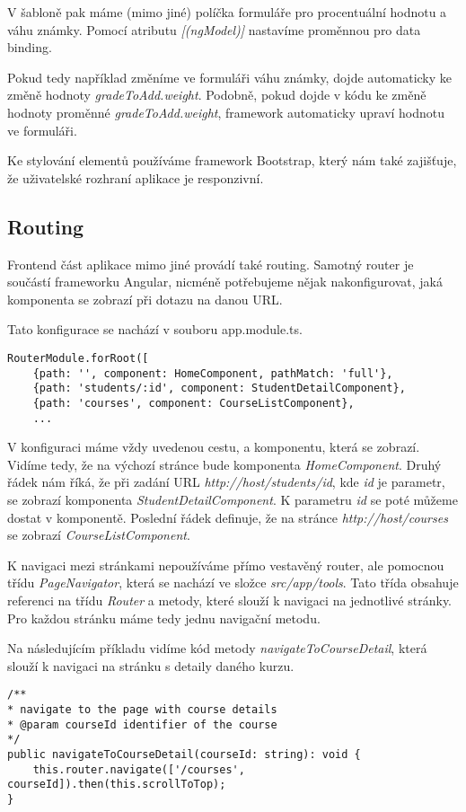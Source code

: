 V šabloně pak máme (mimo jiné) políčka formuláře pro procentuální hodnotu a váhu známky.
Pomocí atributu \textit{[(ngModel)]} nastavíme proměnnou pro data binding. 

Pokud tedy například změníme ve formuláři váhu známky, dojde automaticky ke změně hodnoty \textit{gradeToAdd.weight}. Podobně, pokud dojde v kódu ke změně hodnoty proměnné \textit{gradeToAdd.weight}, framework automaticky upraví hodnotu ve formuláři.

Ke stylování elementů používáme framework Bootstrap, který nám také zajišťuje, že uživatelské rozhraní aplikace je responzivní.

\subsection{Routing}

Frontend část aplikace mimo jiné provádí také routing. Samotný router je součástí frameworku Angular, nicméně potřebujeme nějak nakonfigurovat, jaká komponenta se zobrazí při dotazu na danou URL.

Tato konfigurace se nachází v souboru app.module.ts.
\lstset{style=typescript}
\begin{lstlisting}
RouterModule.forRoot([
	{path: '', component: HomeComponent, pathMatch: 'full'},
	{path: 'students/:id', component: StudentDetailComponent},
	{path: 'courses', component: CourseListComponent},
	...
\end{lstlisting}

V konfiguraci máme vždy uvedenou cestu, a komponentu, která se zobrazí.
Vidíme tedy, že na výchozí stránce bude komponenta \textit{HomeComponent}. 
Druhý řádek nám říká, že při zadání URL \textit{http://host/students/id}, kde \textit{id} je parametr, se zobrazí komponenta \textit{StudentDetailComponent}. K parametru \textit{id} se poté můžeme dostat v komponentě.
Poslední řádek definuje, že na stránce \textit{http://host/courses} se zobrazí \textit{CourseListComponent}.

K navigaci mezi stránkami nepoužíváme přímo vestavěný router, ale pomocnou třídu \textit{PageNavigator}, která se nachází ve složce \textit{src/app/tools}. Tato třída obsahuje referenci na třídu \textit{Router} a metody, které slouží k navigaci na jednotlivé stránky. Pro každou stránku máme tedy jednu navigační metodu.

Na následujícím příkladu vidíme kód metody \textit{navigateToCourseDetail}, která slouží k navigaci na stránku s detaily daného kurzu.
\begin{lstlisting}
/**
* navigate to the page with course details
* @param courseId identifier of the course
*/
public navigateToCourseDetail(courseId: string): void {
	this.router.navigate(['/courses', courseId]).then(this.scrollToTop);
}
\end{lstlisting}


